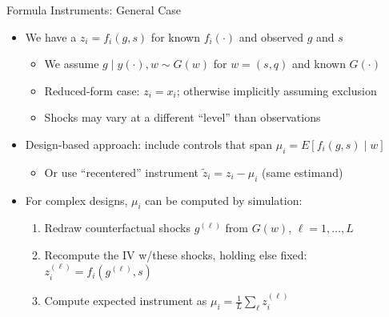 \documentclass[11pt,english]{beamer}
\begin{document}
\begin{frame}{Formula Instruments: General Case}
\begin{itemize}
\item We have a $z_i=f_i(g,s)$ for known $f_i(\cdot)$ and observed $g$ and $s$\smallskip
\begin{itemize}
\item We assume $g\mid y(\cdot),w\sim G(w)$ for $w=(s,q)$ and known $G(\cdot)$\smallskip\pause{}
\item Reduced-form case: $z_i=x_i$; otherwise implicitly assuming exclusion\smallskip\pause{}
\item Shocks may vary at a different ``level'' than observations
\end{itemize}\bigskip\pause{}
\item Design-based approach: include controls that span $\mu_i=E[f_i(g,s)\mid w]$\smallskip\pause{}
\begin{itemize}
\item Or use ``recentered'' instrument $\tilde{z}_i=z_i-\mu_i$ (same estimand)
\end{itemize}\bigskip\pause{}
\item For complex designs, $\mu_i$ can be computed by simulation:\smallskip
\begin{enumerate}
\item Redraw counterfactual shocks $g^{(\ell)}$ from $G(w)$, $\ell=1,\dots,L$ \smallskip\pause{}
\item Recompute the IV w/these shocks, holding else fixed: $z_i^{(\ell)}=f_i(g^{(\ell)},s)$\smallskip\pause{}
\item Compute expected instrument as $\mu_i=\frac{1}{L}\sum_\ell z_i^{(\ell)}$
\end{enumerate}
\end{itemize}
\end{frame}
\end{document}
